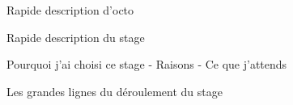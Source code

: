 
Rapide description d'octo

Rapide description du stage

Pourquoi j'ai choisi ce stage
    - Raisons
    - Ce que j'attends

Les grandes lignes du déroulement du stage

